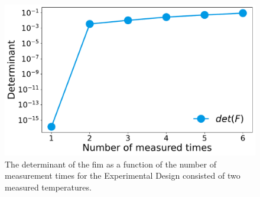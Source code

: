 \documentclass[graybox]{svmult}
\begin{document}
%
%
\begin{figure}[H]
    \centering
    \includegraphics[scale=0.3]{Figures/det_vs_ntimes.pdf}
    \caption{{\footnotesize The determinant of the \ac{fim} as a function of the number of measurement times for the Experimental Design consisted of two measured temperatures.}}
    \label{fig:det_vs_ntimes}
\end{figure}
%
%
\end{document}
